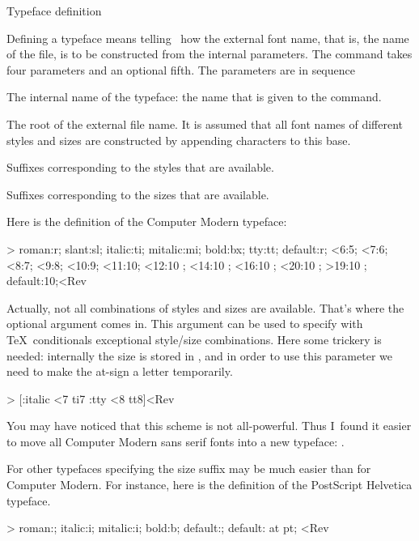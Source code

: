 \SubSection Typeface definition

Defining a typeface means telling \Lollipop\ how the external font
name, that is, the name of the  file, is to be constructed from
the internal parameters. The command  takes four
parameters and an optional fifth. The parameters are in sequence
\Enumerate\item The internal name of the typeface: the name that is
given to the  command.
\item The root of the external file name. It is assumed that all
font names of different styles and sizes are constructed by appending
characters to this base.
\item Suffixes corresponding to the styles that are available.
\item Suffixes corresponding to the sizes that are available.
\>

Here is the definition of the Computer Modern typeface:

\Ver>
    {roman:r; slant:sl; italic:ti; mitalic:mi; bold:bx; tty:tt;
     default:r;}
    {<6:5; <7:6; <8:7; <9:8; <10:9; <11:10; 
     <12:10 \scaled\magstephalf;
     <14:10 \scaled{}; <16:10 \scaled{};
     <20:10 \scaled{}; >19:10 \scaled{};
     default:10;}<Rev

Actually, not all combinations of styles and sizes are available.
That's where the optional argument comes in. This argument can be
used to specify with \TeX\ conditionals exceptional style/size
combinations. Here some trickery is needed: internally the size is
stored in , and in order to use this parameter we need to
make the at-sign a letter temporarily.

\Ver>\makeatletter
{}
    [\ifStyle:italic \ifnum\Fsize<7 ti7\fi\fi
     \ifStyle:tty \ifnum\Fsize<8 tt8\fi\fi]<Rev

You may have noticed that this scheme is not all-powerful. Thus
I~found it easier to move all Computer Modern sans serif fonts into a
new typeface: .

For other typefaces specifying the size suffix may be much easier
than for Computer Modern. For instance, here is the definition of the
PostScript Helvetica typeface.

\Ver>\makeatletter
{}
    {roman:; italic:i; mitalic:i; bold:b; default:;}
    {default: at \Fsize pt;}
\makeatother<Rev


